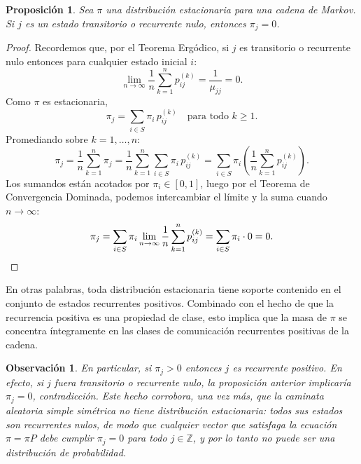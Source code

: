 \documentclass[12pt]{book}
\newtheorem{proposition}{Proposición}[chapter]
\newtheorem{remark}{Observación}[chapter]
\begin{document}
\begin{proposition}
    Sea $\pi$ una distribución estacionaria para una cadena de Markov. Si $j$ es un estado transitorio o recurrente nulo, entonces $\pi_j = 0$.
\end{proposition}

\begin{proof}
    Recordemos que, por el Teorema Ergódico, si $j$ es transitorio o recurrente nulo entonces para cualquier estado inicial $i$:
    \[
        \lim_{n\to\infty} \frac{1}{n}\sum_{k=1}^n p_{ij}^{(k)} = \frac{1}{\mu_{jj}} = 0.
    \]
    Como $\pi$ es estacionaria,
    \[
        \pi_j = \sum_{i\in S} \pi_i\, p_{ij}^{(k)} \quad \text{para todo } k \ge 1.
    \]
    Promediando sobre $k = 1, \dots, n$:
    \[
        \pi_j = \frac{1}{n}\sum_{k=1}^n \pi_j = \frac{1}{n}\sum_{k=1}^n \sum_{i\in S} \pi_i\, p_{ij}^{(k)} = \sum_{i\in S} \pi_i \left(\frac{1}{n}\sum_{k=1}^n p_{ij}^{(k)}\right).
    \]
    Los sumandos están acotados por $\pi_i \in [0,1]$,  luego por el Teorema de Convergencia Dominada, podemos intercambiar el límite y la suma cuando $n \to \infty$:
    \[
        \pi_j = \sum_{i\in S} \pi_i \lim_{n\to\infty}\frac{1}{n}\sum_{k=1}^n p_{ij}^{(k)} = \sum_{i\in S} \pi_i \cdot 0 = 0. \qedhere
    \]
\end{proof}

En otras palabras, toda distribución estacionaria tiene soporte contenido en el conjunto de estados recurrentes positivos. Combinado con el hecho de que la recurrencia positiva es una propiedad de clase, esto implica que la masa de $\pi$ se concentra íntegramente en las clases de comunicación recurrentes positivas de la cadena.

\begin{remark}
    En particular, si $\pi_j > 0$ entonces $j$ es recurrente positivo. En efecto, si $j$ fuera transitorio o recurrente nulo, la proposición anterior implicaría $\pi_j = 0$, contradicción. Este hecho corrobora, una vez más, que la caminata aleatoria simple simétrica no tiene distribución estacionaria: todos sus estados son recurrentes nulos, de modo que cualquier vector que satisfaga la ecuación $\pi = \pi P$ debe cumplir $\pi_j = 0$ para todo $j \in \mathbb{Z}$, y por lo tanto no puede ser una distribución de probabilidad.
\end{remark}
\end{document}
